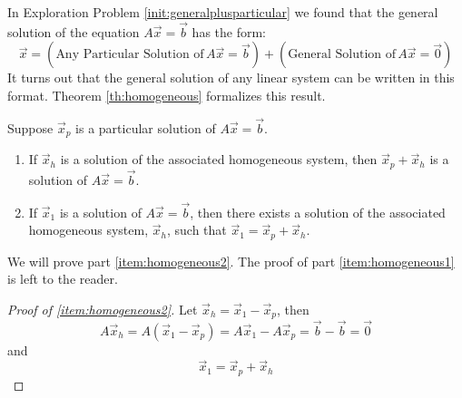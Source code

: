 \documentclass{ximera}
\begin{document}
In Exploration Problem \ref{init:generalplusparticular} we found that the general solution of the equation $A\vec{x}=\vec{b}$ has the form:
 $$\vec{x}=(\text{Any Particular Solution of}\,A\vec{x}=\vec{b}) + (\text{General Solution of}\,A\vec{x}=\vec{0})$$
It turns out that the general solution of any linear system can be written in this format.  Theorem \ref{th:homogeneous} formalizes this result.

\begin{theorem}\label{th:homogeneous}Suppose $\vec{x}_p$ is a particular solution of $A\vec{x}=\vec{b}$.
  \begin{enumerate}
  \item\label{item:homogeneous1} If $\vec{x}_h$ is a solution of the associated homogeneous system, then $\vec{x}_p+\vec{x}_h$ is a solution of $A\vec{x}=\vec{b}$. 
  \item \label{item:homogeneous2}If $\vec{x}_1$ is a solution of $A\vec{x}=\vec{b}$, then there exists a solution of the associated homogeneous system, $\vec{x}_h$, such that  $\vec{x}_1=\vec{x}_p+\vec{x}_h$.
  \end{enumerate}
\end{theorem}
We will prove part \ref{item:homogeneous2}.  The proof of part \ref{item:homogeneous1} is left to the reader.
\begin{proof}[Proof of \ref{item:homogeneous2}]
Let $\vec{x}_h=\vec{x}_1-\vec{x}_p$, then 
$$A\vec{x}_h=A(\vec{x}_1-\vec{x}_p)=A\vec{x}_1-A\vec{x}_p=\vec{b}-\vec{b}=\vec{0}$$
and
$$\vec{x}_1=\vec{x}_p+\vec{x}_h$$
\end{proof}
\end{document}
